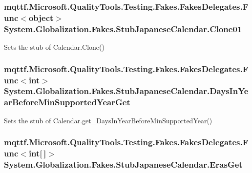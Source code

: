 \hypertarget{class_system_1_1_globalization_1_1_fakes_1_1_stub_japanese_calendar_a8457b5a872a0869b69f5ead66c5d40af}{
\subsubsection[{Clone01}]{\setlength{\rightskip}{0pt plus 5cm}mqttf.\-Microsoft.\-Quality\-Tools.\-Testing.\-Fakes.\-Fakes\-Delegates.\-Func$<$object$>$ System.\-Globalization.\-Fakes.\-Stub\-Japanese\-Calendar.\-Clone01}}\label{class_system_1_1_globalization_1_1_fakes_1_1_stub_japanese_calendar_a8457b5a872a0869b69f5ead66c5d40af}


Sets the stub of Calendar.\-Clone()

\hypertarget{class_system_1_1_globalization_1_1_fakes_1_1_stub_japanese_calendar_aa405a3af6535959e08886c874ba6503f}{
\subsubsection[{Days\-In\-Year\-Before\-Min\-Supported\-Year\-Get}]{\setlength{\rightskip}{0pt plus 5cm}mqttf.\-Microsoft.\-Quality\-Tools.\-Testing.\-Fakes.\-Fakes\-Delegates.\-Func$<$int$>$ System.\-Globalization.\-Fakes.\-Stub\-Japanese\-Calendar.\-Days\-In\-Year\-Before\-Min\-Supported\-Year\-Get}}\label{class_system_1_1_globalization_1_1_fakes_1_1_stub_japanese_calendar_aa405a3af6535959e08886c874ba6503f}


Sets the stub of Calendar.\-get\-\_\-\-Days\-In\-Year\-Before\-Min\-Supported\-Year()

\hypertarget{class_system_1_1_globalization_1_1_fakes_1_1_stub_japanese_calendar_a73411b69cdd5342b3545633e26aafddf}{
\subsubsection[{Eras\-Get}]{\setlength{\rightskip}{0pt plus 5cm}mqttf.\-Microsoft.\-Quality\-Tools.\-Testing.\-Fakes.\-Fakes\-Delegates.\-Func$<$int\mbox{[}$\,$\mbox{]}$>$ System.\-Globalization.\-Fakes.\-Stub\-Japanese\-Calendar.\-Eras\-Get}}\label{class_system_1_1_globalization_1_1_fakes_1_1_stub_japanese_calendar_a73411b69cdd5342b3545633e26aafddf}


